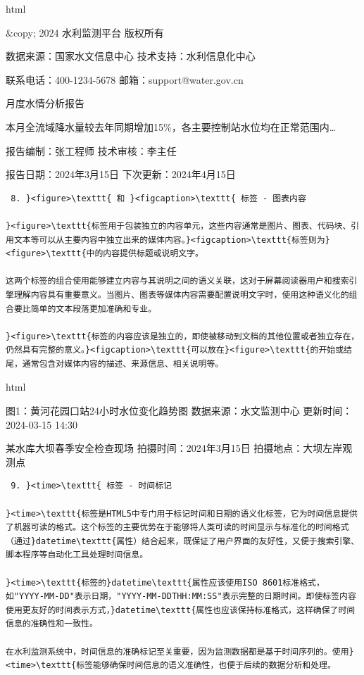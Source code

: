 html

\&copy; 2024 水利监测平台 版权所有

数据来源：国家水文信息中心 \textbar{} 技术支持：水利信息化中心

联系电话：400-1234-5678 \textbar{} 邮箱：support@water.gov.cn

月度水情分析报告

本月全流域降水量较去年同期增加15\%，各主要控制站水位均在正常范围内\ldots{}

报告编制：张工程师 \textbar{} 技术审核：李主任

报告日期：2024年3月15日 \textbar{} 下次更新：2024年4月15日

\begin{lstlisting}
 8. }<figure>\texttt{ 和 }<figcaption>\texttt{ 标签 - 图表内容

}<figure>\texttt{标签用于包装独立的内容单元，这些内容通常是图片、图表、代码块、引用文本等可以从主要内容中独立出来的媒体内容。}<figcaption>\texttt{标签则为}<figure>\texttt{中的内容提供标题或说明文字。

这两个标签的组合使用能够建立内容与其说明之间的语义关联，这对于屏幕阅读器用户和搜索引擎理解内容具有重要意义。当图片、图表等媒体内容需要配置说明文字时，使用这种语义化的组合要比简单的文本段落更加准确和专业。

}<figure>\texttt{标签的内容应该是独立的，即使被移动到文档的其他位置或者独立存在，仍然具有完整的意义。}<figcaption>\texttt{可以放在}<figure>\texttt{的开始或结尾，通常包含对媒体内容的描述、来源信息、相关说明等。
\end{lstlisting}

html

图1：黄河花园口站24小时水位变化趋势图 数据来源：水文监测中心 \textbar{} 更新时间：2024-03-15 14:30

某水库大坝春季安全检查现场 拍摄时间：2024年3月15日 \textbar{} 拍摄地点：大坝左岸观测点

\begin{lstlisting}
 9. }<time>\texttt{ 标签 - 时间标记

}<time>\texttt{标签是HTML5中专门用于标记时间和日期的语义化标签，它为时间信息提供了机器可读的格式。这个标签的主要优势在于能够将人类可读的时间显示与标准化的时间格式（通过}datetime\texttt{属性）结合起来，既保证了用户界面的友好性，又便于搜索引擎、脚本程序等自动化工具处理时间信息。

}<time>\texttt{标签的}datetime\texttt{属性应该使用ISO 8601标准格式，如"YYYY-MM-DD"表示日期，"YYYY-MM-DDTHH:MM:SS"表示完整的日期时间。即使标签内容使用更友好的时间表示方式，}datetime\texttt{属性也应该保持标准格式，这样确保了时间信息的准确性和一致性。

在水利监测系统中，时间信息的准确标记至关重要，因为监测数据都是基于时间序列的。使用}<time>\texttt{标签能够确保时间信息的语义准确性，也便于后续的数据分析和处理。
\end{lstlisting}

